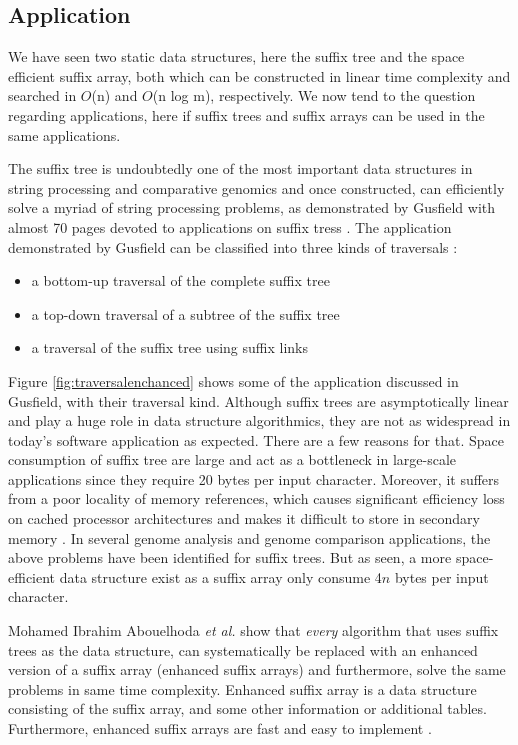 \documentclass[12pt]{article} %
\begin{document}
\subsection{Application}

We have seen two static data structures, here the suffix tree and the space efficient suffix array, both which can be constructed in linear time complexity and searched in $O$(n) and $O$(n log m), respectively. We now tend to the question regarding applications, here if suffix trees and suffix arrays can be used in the same applications.

The suffix tree is undoubtedly one of the most important data structures in string processing and comparative genomics and once constructed, can efficiently solve a myriad of string processing problems, as demonstrated by Gusfield with almost 70 pages devoted to applications on suffix tress \cite{gusfield, enchancedsuffix}. The application demonstrated by Gusfield can be classified into three kinds of traversals \cite{enchancedsuffix}:
\begin{itemize}  
\item a bottom-up traversal of the complete suffix tree 
\item a top-down traversal of a subtree of the suffix tree 
\item a traversal of the suffix tree using suffix links 
\end{itemize}
Figure \ref{fig:traversalenchanced} shows some of the application discussed in Gusfield, with their traversal kind. Although suffix trees are asymptotically linear and play a huge role in data structure algorithmics, they are not as widespread in today's software application as expected. There are a few reasons for that. Space consumption of suffix tree are large and act as a bottleneck in large-scale applications since they require 20 bytes per input character. Moreover, it suffers from a poor locality of memory references, which causes significant efficiency loss on cached processor architectures and makes it difficult to store in secondary memory \cite{enchancedsuffix}. In several genome analysis and genome comparison applications, the above problems have been identified for suffix trees. But as seen, a more space-efficient data structure exist as a suffix array only consume 4$n$ bytes per input character\cite{enchancedsuffix}.   
 
Mohamed Ibrahim Abouelhoda \emph{et al.} \cite{enchancedsuffix} show that \emph{every} algorithm that uses suffix trees as the data structure, can systematically be replaced with an enhanced version of a suffix array (enhanced suffix arrays) and furthermore, solve the same problems in same time complexity. Enhanced suffix array is a data structure consisting of the suffix array, and some other information or additional tables. Furthermore, enhanced suffix arrays are fast and easy to implement \cite{enchancedsuffix}.
\end{document}
